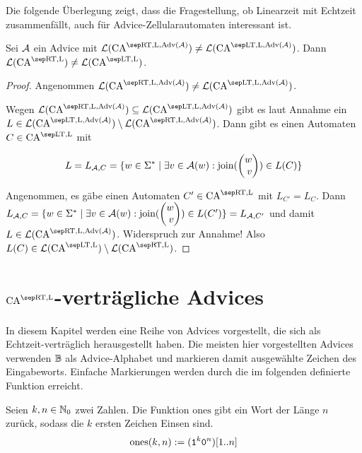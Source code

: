 Die folgende Überlegung zeigt, dass die Fragestellung, ob Linearzeit mit Echtzeit zusammenfällt,
auch für Advice-Zellularautomaten interessant ist.
\begin{satz}
    Sei $\mathcal{A}$ ein Advice mit $\CAL{\CART, \CALeft, \orakel({\advA})} \neq \CAL{\CALT, \CALeft, \orakel({\advA})}$.
    Dann $\CAL{\CART, \CALeft} \neq \CAL{\CALT, \CALeft}$.
\end{satz}
\begin{proof}
    Angenommen $\CAL{\CART, \CALeft, \orakel({\advA})} \neq \CAL{\CALT, \CALeft, \orakel({\advA})}$.
    
    Wegen $\CAL{\CART, \CALeft, \orakel({\advA})} \subseteq \CAL{\CALT, \CALeft, \orakel({\advA})}$
    gibt es laut Annahme ein $L \in \CAL{\CALT, \CALeft, \orakel({\advA})} \setminus \CAL{\CART, \CALeft, \orakel({\advA})}$.
    Dann gibt es einen Automaten $C \in \CAM{\CALT, \CALeft}$ mit
    
    \[
        L = L_{\advA, C} = \set{ w \in \Sigma^*}{\exists v \in \advA(w): \joinw(\Spvek{w; v}) \in L(C)}
    \]
    
    Angenommen, es gäbe einen Automaten $C' \in \CAM{\CART, \CALeft}$ mit $L_{C'} = L_C$.
    Dann $L_{\advA, C} = \set{ w \in \Sigma^*}{\exists v \in \advA(w): \joinw(\Spvek{w; v}) \in L(C')} = L_{\advA, C'}$ und damit
    $L \in \CAL{\CART, \CALeft, \orakel({\advA})}$.
    Widerspruch zur Annahme! Also $L(C) \in \CAL{\CALT, \CALeft} \setminus \CAL{\CART, \CALeft}$.
\end{proof}


\section{\texorpdfstring{$\CAM{\CART, \CALeft}$}{CA\^RT-L}-verträgliche Advices}

In diesem Kapitel werden eine Reihe von Advices vorgestellt, die sich als Echtzeit-verträglich herausgestellt haben.
Die meisten hier vorgestellten Advices verwenden $\mathbb{B}$ als Advice-Alphabet
und markieren damit ausgewählte Zeichen des Eingabeworts.
Einfache Markierungen werden durch die im folgenden definierte Funktion erreicht.

\begin{definition}
    Seien $k, n \in \mathbb{N}_0$ zwei Zahlen. Die Funktion $\mathrm{ones}$ gibt ein Wort der Länge $n$ zurück, sodass die $k$ ersten Zeichen Einsen sind.
    \[
        \mathrm{ones}(k, n) := (\texttt{1}^k \texttt{0}^n)[1..n]
    \]
\end{definition}

